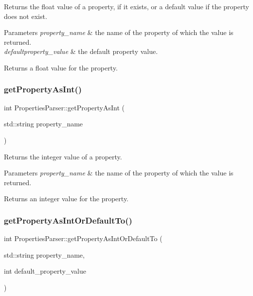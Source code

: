 Returns the float value of a property, if it exists, or a default value if the property does not exist.


\begin{DoxyParams}{Parameters}
{\em property\+\_\+name} & the name of the property of which the value is returned. \\
\hline
{\em defaultproperty\+\_\+value} & the default property value. \\
\hline
\end{DoxyParams}
\begin{DoxyReturn}{Returns}
a float value for the property. 
\end{DoxyReturn}
\mbox{\label{class_properties_parser_ad4fb34e07c2d93e3cf4daca6f1ed9b14}} 
\subsubsection{\texorpdfstring{get\+Property\+As\+Int()}{getPropertyAsInt()}}
{\footnotesize\ttfamily int Properties\+Parser\+::get\+Property\+As\+Int (\begin{DoxyParamCaption}\item[{std\+::string}]{property\+\_\+name }\end{DoxyParamCaption})}

Returns the integer value of a property.


\begin{DoxyParams}{Parameters}
{\em property\+\_\+name} & the name of the property of which the value is returned. \\
\hline
\end{DoxyParams}
\begin{DoxyReturn}{Returns}
an integer value for the property. 
\end{DoxyReturn}
\mbox{\label{class_properties_parser_adadd7db8ea323a727804905d59f59d6d}} 
\subsubsection{\texorpdfstring{get\+Property\+As\+Int\+Or\+Default\+To()}{getPropertyAsIntOrDefaultTo()}}
{\footnotesize\ttfamily int Properties\+Parser\+::get\+Property\+As\+Int\+Or\+Default\+To (\begin{DoxyParamCaption}\item[{std\+::string}]{property\+\_\+name,  }\item[{int}]{default\+\_\+property\+\_\+value }\end{DoxyParamCaption})}

